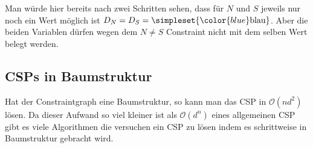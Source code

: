 \noindent
Man würde hier bereits nach zwei Schritten sehen, dass für $N$ und $S$ jeweils nur noch ein Wert möglich ist $D_N=D_S=\simpleset{{\color{blue}\text{blau}}}$. Aber die beiden Variablen dürfen wegen dem $N\neq S$ Constraint nicht mit dem selben Wert belegt werden.



\subsection{CSPs in Baumstruktur}
Hat der Constraintgraph eine Baumstruktur, so kann man das CSP in $\mathcal O(nd^2)$ lösen. Da dieser Aufwand so viel kleiner ist als $\mathcal O(d^n)$ eines allgemeinen CSP gibt es viele Algorithmen die versuchen ein CSP zu lösen indem es schrittweise in Baumstruktur gebracht wird.

